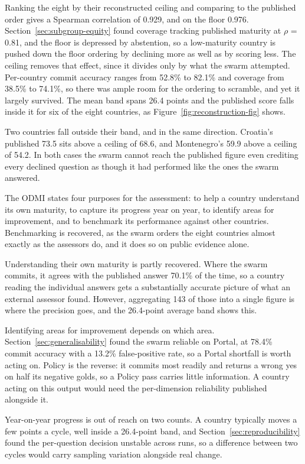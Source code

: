 Ranking the eight by their reconstructed ceiling and comparing to the published order gives a Spearman correlation of 0.929, and on the floor 0.976. Section~\ref{sec:subgroup-equity} found coverage tracking published maturity at $\rho$ = 0.81, and the floor is depressed by abstention, so a low-maturity country is pushed down the floor ordering by declining more as well as by scoring less. The ceiling removes that effect, since it divides only by what the swarm attempted. Per-country commit accuracy ranges from 52.8\% to 82.1\% and coverage from 38.5\% to 74.1\%, so there was ample room for the ordering to scramble, and yet it largely survived. The mean band spans 26.4 points and the published score falls inside it for six of the eight countries, as Figure~\ref{fig:reconstruction-fig} shows.

Two countries fall outside their band, and in the same direction. Croatia's published 73.5 sits above a ceiling of 68.6, and Montenegro's 59.9 above a ceiling of 54.2. In both cases the swarm cannot reach the published figure even crediting every declined question as though it had performed like the ones the swarm answered.

The ODMI states four purposes for the assessment: to help a country understand its own maturity, to capture its progress year on year, to identify areas for improvement, and to benchmark its performance against other countries. Benchmarking is recovered, as the swarm orders the eight countries almost exactly as the assessors do, and it does so on public evidence alone.

Understanding their own maturity is partly recovered. Where the swarm commits, it agrees with the published answer 70.1\% of the time, so a country reading the individual answers gets a substantially accurate picture of what an external assessor found. However, aggregating 143 of those into a single figure is where the precision goes, and the 26.4-point average band shows this.

Identifying areas for improvement depends on which area. Section~\ref{sec:generalisability} found the swarm reliable on Portal, at 78.4\% commit accuracy with a 13.2\% false-positive rate, so a Portal shortfall is worth acting on. Policy is the reverse: it commits most readily and returns a wrong yes on half its negative golds, so a Policy pass carries little information. A country acting on this output would need the per-dimension reliability published alongside it.

Year-on-year progress is out of reach on two counts. A country typically moves a few points a cycle, well inside a 26.4-point band, and Section~\ref{sec:reproducibility} found the per-question decision unstable across runs, so a difference between two cycles would carry sampling variation alongside real change.

